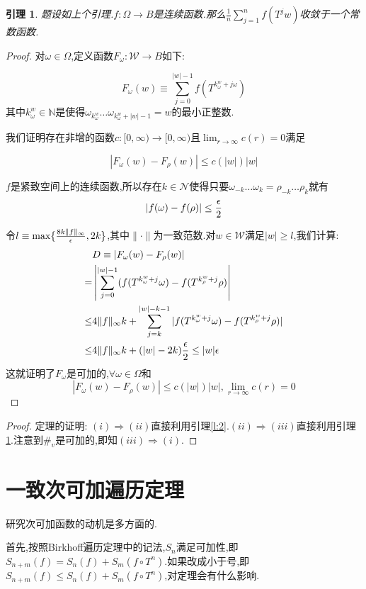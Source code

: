 \documentclass[a4paper,11pt,oneside]{book}
\newtheorem{lemma}{\textbf{\hspace{0.7cm}引理}}[section]
\begin{document}
\begin{lemma}
\label{l:3}
题设如上个引理.$f:\Omega\rightarrow B$是连续函数.那么$\frac{1}{n}\sum_{j=1}^nf(T^jw)$收敛于一个常数函数.
\end{lemma}
\newcommand{\w}{\omega}
\begin{proof}
对$\w\in\Omega$,定义函数$F_\w:\mathcal{W}\rightarrow B$如下:

$$F_\w(w)\equiv \sum_{j=0}^{|w|-1}f(T^{k_\w^w+j\w})$$
其中$k_\w^w\in \mathbb{N}$是使得$\w_{k_\w^w}\ldots\w_{k_\w^w+|w|-1}=w$的最小正整数.

我们证明存在非增的函数$c:[0,\infty)\rightarrow[0,\infty)$且$\lim_{r\to \infty}c(r)=0$满足

$$|F_\w(w)-F_\rho(w)|\leq c(|w|)|w|$$

$f$是紧致空间上的连续函数,所以存在$k\in\mathcal{N}$使得只要$\w_{-k}\ldots\w_k=\rho_{-k}\ldots\rho_k$就有$$|f(\w)-f(\rho)|\leq {\epsilon\over 2}$$

令$l\equiv \max\{{8k\|f\|_\infty \over \epsilon},2k\}$,其中$\|\cdot\|$为一致范数.对$w\in\mathcal{W}$满足$|w|\geq l$,我们计算:
\begin{align*}
&D\equiv|F_\w(w)-F_\rho(w)|\\
=&\left|\sum_{j=0}^{|w|-1}(f(T^{k_\w^w+j}\w)-f(T^{k_\rho^w+j}\rho)\right|\\
\leq &4\|f\|_\infty k+\sum_{j=k}^{|w|-k-1}|f(T^{k_\w^w+j}\w)-f(T^{k_\rho^w+j}\rho)|\\
\leq & 4\|f\|_\infty k+(|w|-2k){\epsilon\over 2}\leq |w|\epsilon
\end{align*}
这就证明了$F_\w$是可加的,$\forall \w\in\Omega$和$$|F_\w(w)-F_\rho(w)|\leq c(|w|)|w|,\lim_{r\to \infty}c(r)=0$$
\end{proof}

\begin{proof}
定理的证明:
$(i)\Rightarrow(ii)$直接利用引理\ref{l:2}.$(ii)\Rightarrow(iii)$直接利用引理\ref{l:3}.注意到$\#_v$是可加的,即知$(iii)\Rightarrow (i)$.
\end{proof}


\section{一致次可加遍历定理}
研究次可加函数的动机是多方面的.


首先,按照Birkhoff遍历定理中的记法,$S_n$满足可加性,即$S_{n+m}(f)=S_n(f)+S_m(f\circ T^n)$.如果改成小于号,即$S_{n+m}(f)\leq S_n(f)+S_m(f\circ T^n)$,对定理会有什么影响.
\end{document}
